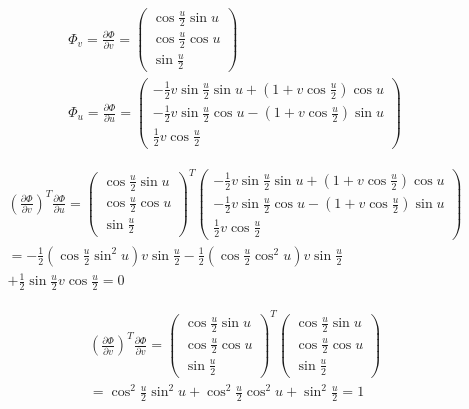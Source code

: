 {\begin{equation}
\begin{split}
\Phi _{v}=\frac{\partial \Phi }{\partial v}=\allowbreak
\begin{pmatrix}
\cos \frac{u}{2}\sin u \\
\cos \frac{u}{2}\cos u \\
\sin \frac{u}{2}
\end{pmatrix}
 \\
\Phi _{u}=\frac{\partial \Phi }{\partial u}=\allowbreak
\begin{pmatrix}
-\frac{1}{2}v\sin \frac{u}{2}\sin u+\left( 1+v\cos \frac{u}{2}\right) \cos u \\
-\frac{1}{2}v\sin \frac{u}{2}\cos u-\left( 1+v\cos \frac{u}{2}\right) \sin u \\
\frac{1}{2}v\cos \frac{u}{2}
\end{pmatrix}
\end{split}
\end{equation}


\begin{equation}
\begin{split}
(\frac{\partial \Phi }{\partial v})^{T}\frac{\partial \Phi }{\partial u}
=  \allowbreak
\begin{pmatrix}
\cos \frac{u}{2}\sin u \\
\cos \frac{u}{2}\cos u \\
\sin \frac{u}{2}
\end{pmatrix}^{T}
\begin{pmatrix}
-\frac{1}{2}v\sin \frac{u}{2}\sin u+\left( 1+v\cos \frac{u}{2}\right) \cos u \\
-\frac{1}{2}v\sin \frac{u}{2}\cos u-\left( 1+v\cos \frac{u}{2}\right) \sin u \\
\frac{1}{2}v\cos \frac{u}{2}
\end{pmatrix}
\\
=
-\frac{1}{2}\left( \cos \frac{u}{2}\sin ^{2}u\right) v\sin \frac{u}{2}-%
\frac{1}{2}\left( \cos \frac{u}{2}\cos ^{2}u\right) v\sin \frac{u}{2}
\\
+%
\frac{1}{2}\sin \frac{u}{2} v\cos \frac{u}{2}=\allowbreak 0
\end{split}
\end{equation}

\begin{equation}
\begin{split}
(\frac{\partial \Phi }{\partial v})^{T}\frac{\partial \Phi }{\partial v}
=\allowbreak
\begin{pmatrix}
\cos \frac{u}{2}\sin u \\
\cos \frac{u}{2}\cos u \\
\sin \frac{u}{2}
\end{pmatrix}^{T}
\begin{pmatrix}
\cos \frac{u}{2}\sin u \\
\cos \frac{u}{2}\cos u \\
\sin \frac{u}{2}
\end{pmatrix}
 \\
=
\cos ^{2}\frac{u}{2}\sin ^{2}u+\cos ^{2}\frac{u}{2}\cos ^{2}u+\sin ^{2}%
\frac{u}{2}=\allowbreak 1
\end{split}
\end{equation}


}
